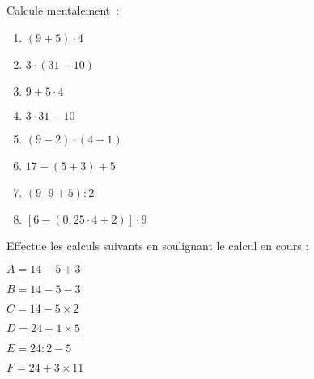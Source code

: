 \begin{exercice}
Calcule mentalement :
\begin{enumerate}
 \item $(9 + 5) \cdot 4$ \dotfill
 
 \dotfill
 
 \item $3 \cdot (31 - 10)$ \dotfill
 
 \dotfill
 
 \item $9 + 5 \cdot 4	$ \dotfill
 
 \dotfill
 
 \item $3 \cdot 31 - 10$ \dotfill      
 
 \dotfill
  
 \item $(9 - 2) \cdot (4 + 1)$ \dotfill
 
 \dotfill
 
 \item $17 - (5 + 3) + 5$ \dotfill
 
 \dotfill
 
 \item $(9 \cdot 9 + 5) : 2$ \dotfill
 
 \dotfill
  
 \item $[6 - (0,25 \cdot 4 + 2)] \cdot 9$ \dotfill	
 
 \dotfill
 \end{enumerate}
\end{exercice}


\begin{exercice}
Effectue les calculs suivants en soulignant le calcul en cours :

$A = 14 - 5 + 3$ \dotfill

\dotfill

$B = 14 - 5 - 3$	 \dotfill

\dotfill
	
$C = 14 - 5 \times 2$	 \dotfill

\dotfill
	
$D = 24 + 1 \times 5$ \dotfill	

\dotfill
	
$E = 24 : 2 - 5$ \dotfill

\dotfill
	
$F = 24 + 3 \times 11$ \dotfill

\dotfill
\end{exercice}



